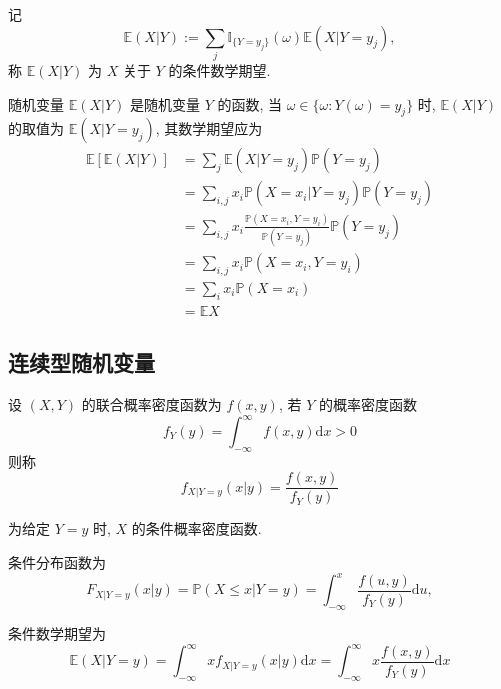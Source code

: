\documentclass[openany]{ctexbook}
\theoremstyle{kaiti}
\theoremstyle{normal}
\begin{document}
记
\begin{equation}
  \mathbb{E}(X|Y):=\sum_j\mathbb{I}_{\{Y=y_j\}}(\omega)\mathbb{E}(X|Y=y_j),
\end{equation}
称 $\mathbb{E}(X|Y)$ 为 $X$ 关于 $Y$ 的条件数学期望. 

随机变量 $\mathbb{E}(X|Y)$ 是随机变量 $Y$ 的函数, 当 $\omega\in\{\omega:Y(\omega)=y_j\}$ 时, $\mathbb{E}(X|Y)$ 的取值为 $\mathbb{E}(X|Y=y_j)$, 其数学期望应为 
\begin{equation}
  \begin{aligned}
  \mathbb{E}[\mathbb{E}(X|Y)]
  &=\sum_j\mathbb{E}(X|Y=y_j)\mathbb{P}(Y=y_j)\\
  &=\sum_{i,j}x_i\mathbb{P}(X=x_i|Y=y_j)\mathbb{P}(Y=y_j)\\
  &=\sum_{i,j}x_i\frac{\mathbb{P}(X=x_i,Y=y_i)}{\mathbb{P}(Y=y_j)}\mathbb{P}(Y=y_j)\\
  &=\sum_{i,j}x_i\mathbb{P}(X=x_i,Y=y_i)\\
  &=\sum_{i}x_i\mathbb{P}(X=x_i)\\
  &=\mathbb{E}X
  \end{aligned}
\end{equation}

\subsection{连续型随机变量}

设 $(X,Y)$ 的联合概率密度函数为 $f(x,y)$, 若 $Y$ 的概率密度函数 
\begin{equation}
  f_Y(y)=\int_{-\infty}^\infty f(x,y)\mathrm{d}x>0
\end{equation} 
则称
\begin{equation}
  f_{X|Y=y}(x|y)=\frac{f(x,y)}{f_Y(y)}
\end{equation}

为给定 $Y=y$ 时, $X$ 的条件概率密度函数.

条件分布函数为
\begin{equation}
  F_{X|Y=y}(x|y)=\mathbb{P}(X\leqslant x|Y=y)=\int_{-\infty}^x\frac{f(u,y)}{f_Y(y)}\mathrm{d}u,
\end{equation}

条件数学期望为
\begin{equation}
  \mathbb{E}(X|Y=y)=\int_{-\infty}^\infty xf_{X|Y=y}(x|y)\mathrm{d}x=\int_{-\infty}^\infty x\frac{f(x,y)}{f_Y(y)}\mathrm{d}x
\end{equation}
\end{document}
